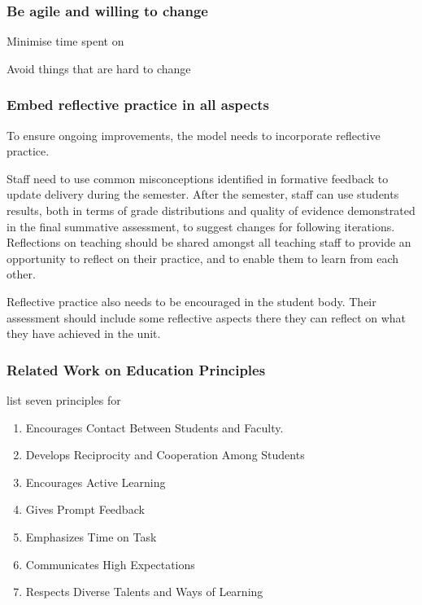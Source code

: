 \subsubsection{Be agile and willing to change} %
\label{ssub:be_agile_and_willing_to_change}

Minimise time spent on 

Avoid things that are hard to change



\subsubsection{Embed reflective practice in all aspects} %
\label{ssub:embed_reflective_practice_in_all_aspects}

To ensure ongoing improvements, the model needs to incorporate reflective practice. 

Staff need to use common misconceptions identified in formative feedback to update delivery during the semester. After the semester, staff can use students results, both in terms of grade distributions and quality of evidence demonstrated in the final summative assessment, to suggest changes for following iterations. Reflections on teaching should be shared amongst all teaching staff to provide an opportunity to reflect on their practice, and to enable them to learn from each other.

Reflective practice also needs to be encouraged in the student body. Their assessment should include some reflective aspects there they can reflect on what they have achieved in the unit. 








\subsubsection{Related Work on Education Principles} %
\label{ssub:related_work_on_education_principles}

\citet{Chickering:1987} list seven principles for 
\begin{enumerate}
	\item Encourages Contact Between Students and Faculty.
	\item Develops Reciprocity and Cooperation Among Students
	\item Encourages Active Learning
	\item Gives Prompt Feedback
	\item Emphasizes Time on Task
	\item Communicates High Expectations
	\item Respects Diverse Talents and Ways of Learning
\end{enumerate}



